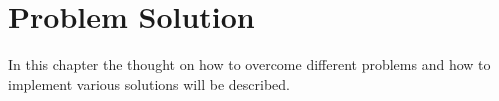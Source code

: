 \chapter{Problem Solution}
\label{cha:solution}
In this chapter the thought on how to overcome different problems and how to implement various solutions will be described. 
















